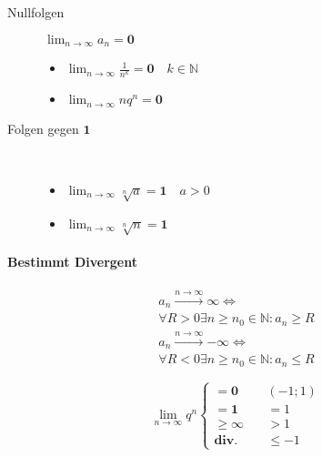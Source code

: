 \begin{description}
      \item [Nullfolgen] $\lim_{n \rightarrow \infty} a_n = \mathbf{0}$
            \begin{itemize}
                  \item  $\lim_{n \rightarrow \infty} \frac{1}{n^k} = \mathbf{0} \quad k \in \mathbb{N}$

                  \item $\lim_{n \rightarrow \infty} nq^n = \mathbf{0}$
            \end{itemize}

            \item[Folgen gegen $\mathbf{1}$]\

            \begin{itemize}
                  \item $\lim_{n \rightarrow \infty} \sqrt[n]{a} = \mathbf{1} \quad a > 0$

                  \item $\lim_{n \rightarrow \infty} \sqrt[n]{n} = \mathbf{1}$
            \end{itemize}

\end{description}

\paragraph{Bestimmt Divergent}

\begin{gather*}
      a_n \xrightarrow{n \rightarrow \infty} \boldsymbol{\infty} \Leftrightarrow \\ \forall R \boldsymbol{>} 0 \exists n \geq n_0 \in \mathbb{N}: a_n \boldsymbol{\geq} R \\
      a_n \xrightarrow{n \rightarrow \infty} \boldsymbol{-\infty} \Leftrightarrow \\ \forall R \boldsymbol{<} 0 \exists n \geq n_0 \in \mathbb{N}: a_n \boldsymbol{\leq} R
\end{gather*}

$$
      \lim_{n \rightarrow \infty} q^n \begin{cases}
            = \mathbf{0} \quad         & (-1; 1) \\
            = \mathbf{1} \quad         & = 1     \\
            \geq \mathbf{\infty} \quad & > 1     \\
            \mathbf{\text{div.}} \quad & \leq -1
      \end{cases}
$$

